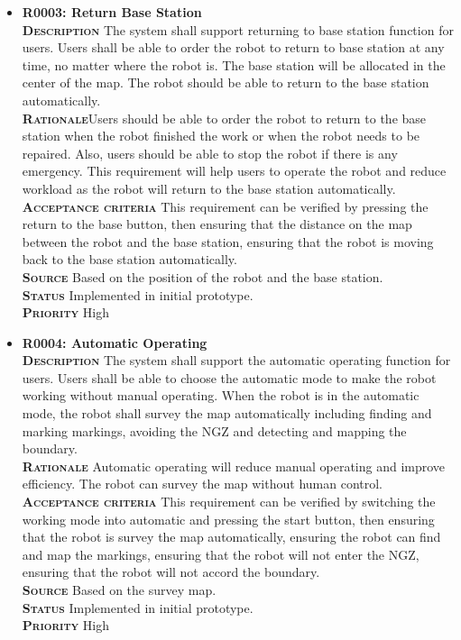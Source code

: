 \documentclass[11pt, a4paper]{article}
\begin{document}
\begin{itemize}
\item {\bfseries R0003: Return Base Station}\\
\textsc{\bfseries Description} The system shall support returning to base station function for users. Users shall be able to order the robot to return to base station at any time, no matter where the robot is. The base station will be allocated in the center of the map. The robot should be able to return to the base station automatically.\\
\textsc{\bfseries Rationale}Users should be able to order the robot to return to the base station when the robot finished the work or when the robot needs to be repaired. Also, users should be able to stop the robot if there is any emergency. This requirement will help users to operate the robot and reduce workload as the robot will return to the base station automatically.\\
\textsc{\bfseries Acceptance criteria} This requirement can be verified by pressing the return to the base button, then ensuring that the distance on the map between the robot and the base station, ensuring that the robot is moving back to the base station automatically.\\
\textsc{\bfseries Source} Based on the position of the robot and the base station.\\
\textsc{\bfseries Status} Implemented in initial prototype.\\
\textsc{\bfseries Priority} High\\

\item {\bfseries R0004: Automatic Operating}\\
\textsc{\bfseries Description} The system shall support the automatic operating function for users. Users shall be able to choose the automatic mode to make the robot working without manual operating. When the robot is in the automatic mode, the robot shall survey the map automatically including finding and marking markings, avoiding the NGZ and detecting and mapping the boundary.\\
\textsc{\bfseries Rationale}  Automatic operating will reduce manual operating and improve efficiency. The robot can survey the map without human control.\\
\textsc{\bfseries Acceptance criteria} This requirement can be verified by switching the working mode into automatic and pressing the start button, then ensuring that the robot is survey the map automatically, ensuring the robot can find and map the markings, ensuring that the robot will not enter the NGZ, ensuring that the robot will not accord the boundary.\\
\textsc{\bfseries Source} Based on the survey map.\\
\textsc{\bfseries Status} Implemented in initial prototype.\\
\textsc{\bfseries Priority} High\\


\end{itemize}
\end{document}
